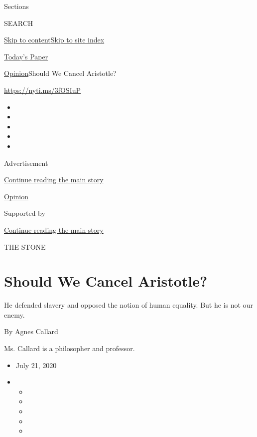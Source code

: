 Sections

SEARCH

\protect\hyperlink{site-content}{Skip to
content}\protect\hyperlink{site-index}{Skip to site index}

\href{https://myaccount.nytimes3xbfgragh.onion/auth/login?response_type=cookie\&client_id=vi}{}

\href{https://www.nytimes3xbfgragh.onion/section/todayspaper}{Today's
Paper}

\href{/section/opinion}{Opinion}\textbar{}Should We Cancel Aristotle?

\url{https://nyti.ms/3fOSIuP}

\begin{itemize}
\item
\item
\item
\item
\item
\end{itemize}

Advertisement

\protect\hyperlink{after-top}{Continue reading the main story}

\href{/section/opinion}{Opinion}

Supported by

\protect\hyperlink{after-sponsor}{Continue reading the main story}

THE STONE

\hypertarget{should-we-cancel-aristotle}{%
\section{Should We Cancel Aristotle?}\label{should-we-cancel-aristotle}}

He defended slavery and opposed the notion of human equality. But he is
not our enemy.

By Agnes Callard

Ms. Callard is a philosopher and professor.

\begin{itemize}
\item
  July 21, 2020
\item
  \begin{itemize}
  \item
  \item
  \item
  \item
  \item
  \end{itemize}
\end{itemize}

